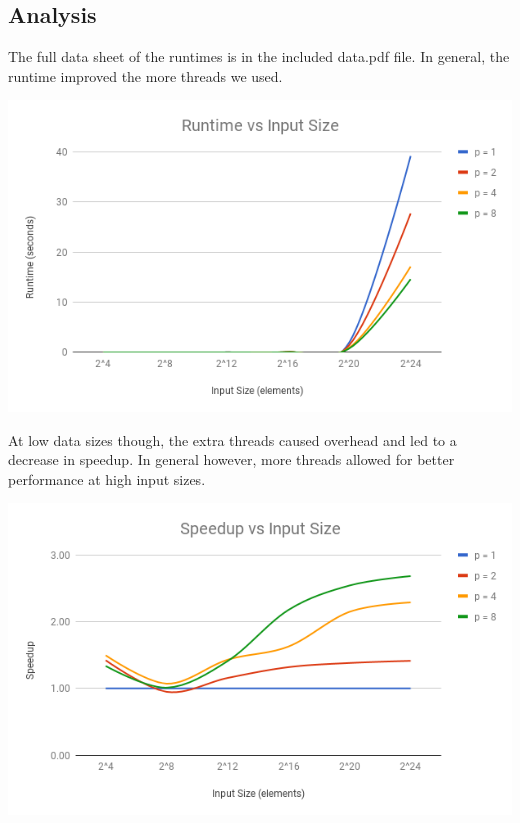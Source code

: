 \documentclass{math}
\begin{document}
\subsection*{Analysis}
The full data sheet of the runtimes is in the included data.pdf file.
In general, the runtime improved the more threads we used.
\begin{center}
  \includegraphics[width=16cm]{assets/project2_runtime.png}
\end{center}
At low data sizes though, the extra threads caused overhead and led to a
decrease in speedup. In general however, more threads allowed for better
performance at high input sizes.
\begin{center}
  \includegraphics[width=16cm]{assets/project2_speedup.png}
\end{center}
\end{document}
